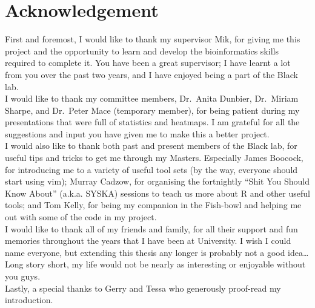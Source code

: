 
\vspace*{\fill}

\section*{\centering Acknowledgement}

First and foremost, I would like to thank my supervisor Mik, for giving me this project and the opportunity to learn and develop the bioinformatics skills required to complete it.
You have been a great supervisor; I have learnt a lot from you over the past two years, and I have enjoyed being a part of the Black lab.
\\

\noindent
I would like to thank my committee members, Dr.\ Anita Dunbier, Dr.\ Miriam Sharpe, and Dr.\ Peter Mace (temporary member), for being patient during my presentations that were full of statistics and heatmaps.
I am grateful for all the suggestions and input you have given me to make this a better project.
\\

\noindent
I would also like to thank both past and present members of the Black lab, for useful tips and tricks to get me through my Masters.
Especially James Boocock, for introducing me to a variety of useful tool sets (by the way, everyone should start using vim); Murray Cadzow, for organising the fortnightly ``Shit You Should Know About'' (a.k.a. SYSKA) sessions to teach us more about R and other useful tools; and Tom Kelly, for being my companion in the Fish-bowl and helping me out with some of the code in my project.
\\

\noindent
I would like to thank all of my friends and family, for all their support and fun memories throughout the years that I have been at University.
I wish I could name everyone, but extending this thesis any longer is probably not a good idea\ldots{}
Long story short, my life would not be nearly as interesting or enjoyable without you guys.
\\

\noindent
Lastly, a special thanks to Gerry and Tessa who generously proof-read my introduction.
\\

\vfill

